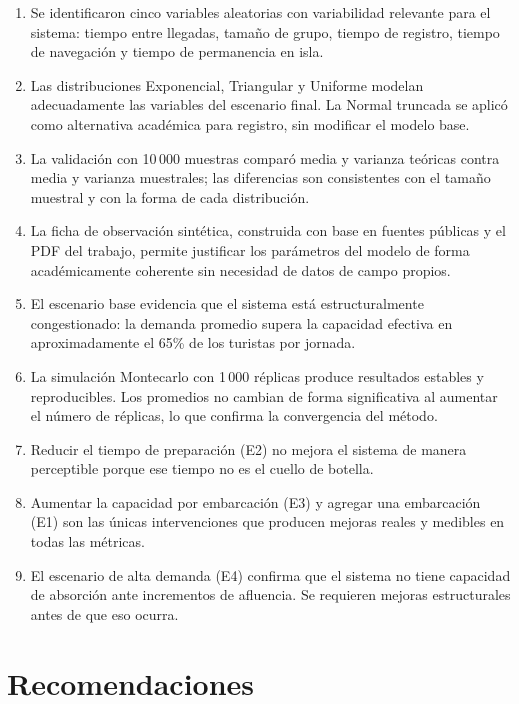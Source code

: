 \documentclass[12pt,a4paper]{article}
\begin{document}
\begin{enumerate}[noitemsep]
  \item Se identificaron cinco variables aleatorias con variabilidad
    relevante para el sistema: tiempo entre llegadas, tamaño de grupo,
    tiempo de registro, tiempo de navegación y tiempo de permanencia
    en isla.
  \item Las distribuciones Exponencial, Triangular y Uniforme modelan
    adecuadamente las variables del escenario final. La Normal truncada
    se aplicó como alternativa académica para registro, sin modificar el
    modelo base.
  \item La validación con 10\,000 muestras comparó media y varianza
    teóricas contra media y varianza muestrales; las diferencias son
    consistentes con el tamaño muestral y con la forma de cada distribución.
  \item La ficha de observación sintética, construida con base en
    fuentes públicas y el PDF del trabajo, permite justificar los
    parámetros del modelo de forma académicamente coherente sin
    necesidad de datos de campo propios.
  \item El escenario base evidencia que el sistema está estructuralmente
    congestionado: la demanda promedio supera la capacidad efectiva en
    aproximadamente el 65\% de los turistas por jornada.
  \item La simulación Montecarlo con 1\,000 réplicas produce resultados
    estables y reproducibles. Los promedios no cambian de forma
    significativa al aumentar el número de réplicas, lo que confirma
    la convergencia del método.
  \item Reducir el tiempo de preparación (E2) no mejora el sistema de
    manera perceptible porque ese tiempo no es el cuello de botella.
  \item Aumentar la capacidad por embarcación (E3) y agregar una
    embarcación (E1) son las únicas intervenciones que producen mejoras
    reales y medibles en todas las métricas.
  \item El escenario de alta demanda (E4) confirma que el sistema no
    tiene capacidad de absorción ante incrementos de afluencia. Se
    requieren mejoras estructurales antes de que eso ocurra.
\end{enumerate}

\section{Recomendaciones}
\end{document}
